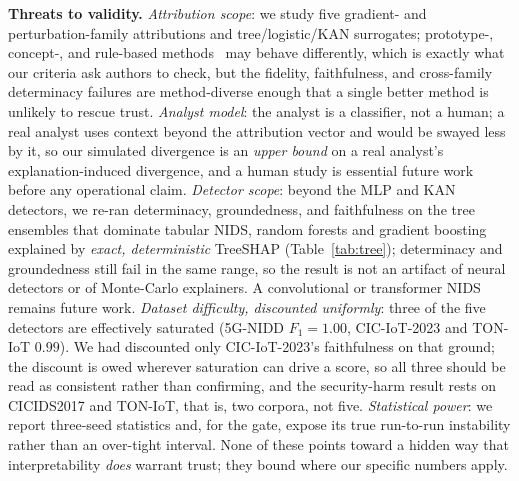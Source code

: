 \documentclass[conference]{IEEEtran}
\begin{document}
\textbf{Threats to validity.} \emph{Attribution scope}: we study five gradient- and perturbation-family attributions and
tree/logistic/KAN surrogates; prototype-, concept-, and rule-based
methods~\cite{ribeiro2018anchors} may behave differently, which is exactly what our criteria ask
authors to check, but the fidelity, faithfulness, and cross-family determinacy failures are
method-diverse enough that a single better method is unlikely to rescue trust. \emph{Analyst
model}: the analyst is a classifier, not a human; a real analyst uses context beyond the
attribution vector and would be swayed less by it, so our simulated divergence is an \emph{upper
bound} on a real analyst's explanation-induced divergence, and a human study is essential future
work before any operational claim. \emph{Detector scope}: beyond the MLP and KAN detectors, we
re-ran determinacy, groundedness, and faithfulness on the tree ensembles that dominate tabular
NIDS, random forests and gradient boosting explained by \emph{exact, deterministic} TreeSHAP
(Table~\ref{tab:tree}); determinacy and groundedness still fail in the same range, so the result is
not an artifact of neural detectors or of Monte-Carlo explainers. A convolutional or transformer NIDS remains future
work. \emph{Dataset difficulty, discounted uniformly}: three of the five detectors are effectively
saturated (5G-NIDD $F_1{=}1.00$, CIC-IoT-2023 and TON-IoT $0.99$). We had discounted only
CIC-IoT-2023's faithfulness on that ground; the discount is owed wherever saturation can drive a
score, so all three should be read as consistent rather than confirming, and the security-harm
result rests on CICIDS2017 and TON-IoT, that is, two corpora, not five. \emph{Statistical power}: we report three-seed
statistics and, for the gate, expose its true run-to-run instability rather than an
over-tight interval. None of these points toward a hidden way that interpretability \emph{does}
warrant trust; they bound where our specific numbers apply.

\end{document}
